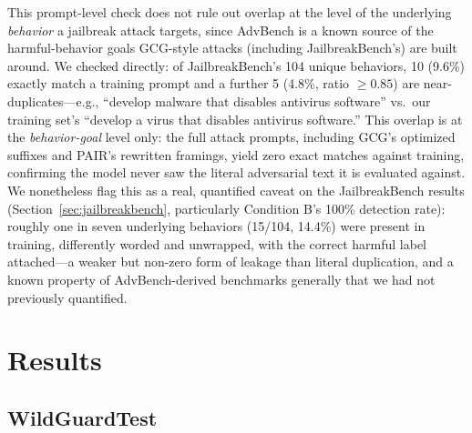 \documentclass[Superintelligence,article,submit,pdftex,moreauthors]{Definitions/mdpi}
\begin{document}
This prompt-level check does not rule out overlap at the level of the underlying \emph{behavior} a jailbreak attack targets, since AdvBench is a known source of the harmful-behavior goals GCG-style attacks (including JailbreakBench's) are built around. We checked directly: of JailbreakBench's 104 unique behaviors, 10 (9.6\%) exactly match a training prompt and a further 5 (4.8\%, ratio $\geq 0.85$) are near-duplicates---e.g., ``develop malware that disables antivirus software'' vs.\ our training set's ``develop a virus that disables antivirus software.'' This overlap is at the \emph{behavior-goal} level only: the full attack prompts, including GCG's optimized suffixes and PAIR's rewritten framings, yield zero exact matches against training, confirming the model never saw the literal adversarial text it is evaluated against. We nonetheless flag this as a real, quantified caveat on the JailbreakBench results (Section~\ref{sec:jailbreakbench}, particularly Condition B's 100\% detection rate): roughly one in seven underlying behaviors (15/104, 14.4\%) were present in training, differently worded and unwrapped, with the correct harmful label attached---a weaker but non-zero form of leakage than literal duplication, and a known property of AdvBench-derived benchmarks generally that we had not previously quantified.

\section{Results}
\label{sec:results}

\subsection{WildGuardTest}
\end{document}
